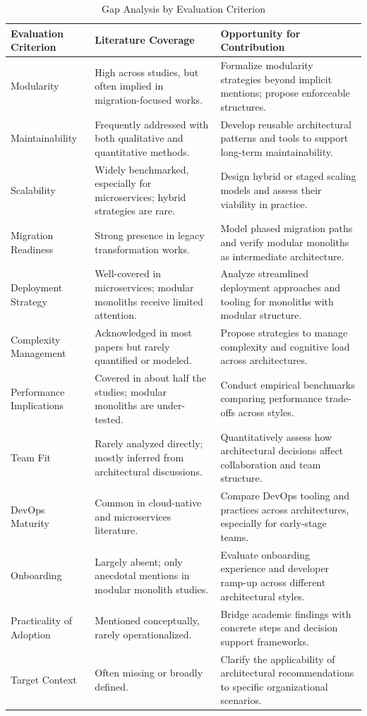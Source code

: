 \begin{table}[H]
\centering
\small
\caption{Gap Analysis by Evaluation Criterion}
\label{tab:gap-analysis}
\begin{tabular}{|p{4.0cm}|p{5.2cm}|p{6.2cm}|}
\hline
\rowcolor{gray!30}
\textbf{Evaluation Criterion} & \textbf{Literature Coverage} & \textbf{Opportunity for Contribution} \\
\hline
Modularity & High across studies, but often implied in migration-focused works. & Formalize modularity strategies beyond implicit mentions; propose enforceable structures. \\
\hline
Maintainability & Frequently addressed with both qualitative and quantitative methods. & Develop reusable architectural patterns and tools to support long-term maintainability. \\
\hline
Scalability & Widely benchmarked, especially for microservices; hybrid strategies are rare. & Design hybrid or staged scaling models and assess their viability in practice. \\
\hline
Migration Readiness & Strong presence in legacy transformation works. & Model phased migration paths and verify modular monoliths as intermediate architecture. \\
\hline
Deployment Strategy & Well-covered in microservices; modular monoliths receive limited attention. & Analyze streamlined deployment approaches and tooling for monoliths with modular structure. \\
\hline
Complexity Management & Acknowledged in most papers but rarely quantified or modeled. & Propose strategies to manage complexity and cognitive load across architectures. \\
\hline
Performance Implications & Covered in about half the studies; modular monoliths are under-tested. & Conduct empirical benchmarks comparing performance trade-offs across styles. \\
\hline
Team Fit & Rarely analyzed directly; mostly inferred from architectural discussions. & Quantitatively assess how architectural decisions affect collaboration and team structure. \\
\hline
DevOps Maturity & Common in cloud-native and microservices literature. & Compare DevOps tooling and practices across architectures, especially for early-stage teams. \\
\hline
Onboarding & Largely absent; only anecdotal mentions in modular monolith studies. & Evaluate onboarding experience and developer ramp-up across different architectural styles. \\
\hline
Practicality of Adoption & Mentioned conceptually, rarely operationalized. & Bridge academic findings with concrete steps and decision support frameworks. \\
\hline
Target Context & Often missing or broadly defined. & Clarify the applicability of architectural recommendations to specific organizational scenarios. \\
\hline
\end{tabular}
\end{table}

